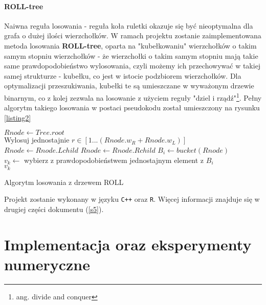 \documentclass{article}
\def\lecturemark{}
\newcommand{\spr}[1]{\part{#1}\def\lecturemark{\partname\ \thepart: #1}}
\renewcommand{\partname}{Sprawozdanie}
\renewcommand{\thepart}{\arabic{part}}
\begin{document}
	\subsection{ROLL-tree}
	Naiwna reguła losowania - reguła koła ruletki okazuje się być nieoptymalna dla grafa o dużej ilości wierzchołków. W ramach projektu zostanie zaimplementowana metoda losowania \textbf{ROLL-tree}\cite{rolltree}, oparta na "kubełkowaniu" wierzchołków o takim samym stopniu wierzchołków - że wierzchołki o takim samym stopniu mają takie same prawdopodobieństwo wylosowania, czyli możemy ich przechowywać w takiej samej strukturze - kubełku, co jest w istocie podzbiorem wierzchołków. Dla optymalizacji przeszukiwania, kubełki te są umieszczane w wyważonym drzewie binarnym, co z kolej zezwala na losowanie z użyciem reguły "dziel i rządź"\footnote{ang. divide and conquer}. Pełny algorytm takiego losowania w postaci pseudokodu został umieszczony na  rysunku \ref{listing2}\\
	\begin{algorithm}[H]
	$Rnode \leftarrow Tree.root$\\
	\SetAlgoNoLine
	 {
		Wylosuj  jednostajnie $r \in [1...(Rnode.w_R + Rnode.w_L)]$\\
		\SetAlgoNoLine
		 {
			$Rnode \leftarrow Rnode.Lchild$
		} {
			$Rnode \leftarrow Rnode.Rchild$
		}
	}
	$B_i \leftarrow bucket(Rnode)$\\
	$v_k \leftarrow$ wybierz z prawdopodobieństwem jednostajnym element z $B_i$\\
	\Return $v_k$
	\label{listing2}
	\caption{Algorytm losowania z drzewem ROLL}
	\end{algorithm}

	Projekt zostanie wykonany w języku \texttt{C++} oraz \texttt{R}. Więcej informacji znajduje się w drugiej części dokumentu (\ref{s5}).
\newpage
\spr{Implementacja oraz eksperymenty numeryczne \label{part2}}
\end{document}
